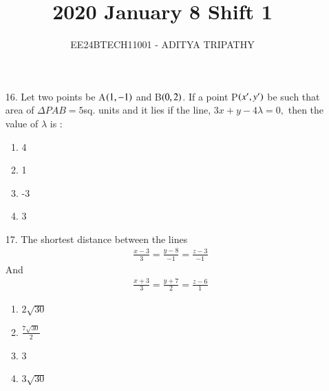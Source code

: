 \documentclass[journal,12pt,onecolumn]{IEEEtran}
\theoremstyle{remark}
\begin{document}

\vspace{3cm}

\title{2020 January 8 Shift 1}
\author{EE24BTECH11001 -  ADITYA TRIPATHY}
\maketitle

\renewcommand{\thefigure}{\theenumi}
\renewcommand{\thetable}{\theenumi}

\begin{enumerate}
	\item[16.] 
		Let two points be A$\left(1, -1\right)$ and B$\left(0, 2\right)$. If a point P$\left(x', y'\right)$ be
		such that area of $\Delta PAB = 5$sq. units and it lies if the line, $3x + y - 4\lambda = 0,$ then
		the value of $\lambda$ is :
	\begin{multicols}{4}
		\begin{enumerate}
			\item 4 
			\columnbreak
			\item 1
			\columnbreak
			\item -3
			\columnbreak
			\item 3
		\end{enumerate}
	\end{multicols}

	\item[17.] The shortest distance between the lines
		\begin{align*}
		\frac{x-3}{3} = \frac{y-8}{-1} = \frac{z-3}{-1}
		\end{align*} And
		\begin{align}
			\frac{x+3}{3} = \frac{y+7}{2} = \frac{z-6}{1}
		\end{align}
	\begin{multicols}{4}
		\begin{enumerate}
			\item $2\sqrt{30}$ \columnbreak
			\item $\frac{7\sqrt{30}}{2}$ \columnbreak
			\item 3 \columnbreak
			\item $3\sqrt{30}$
		\end{enumerate}
	\end{multicols}



\end{enumerate}
\end{document}
